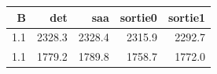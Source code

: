 \begin{tabular}{rrrrr}
\toprule
B & det & saa & sortie0 & sortie1 \\
\midrule
1.1 & 2328.3 & 2328.4 & 2315.9 & 2292.7 \\
1.1 & 1779.2 & 1789.8 & 1758.7 & 1772.0 \\
\bottomrule
\end{tabular}

